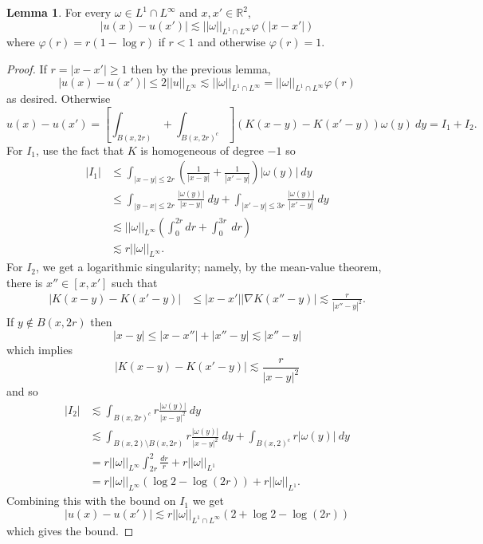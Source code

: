 \documentclass[12pt]{book}
\newcommand{\RR}{\mathbb{R}}
\theoremstyle{definition}
\newtheorem{lemma}[theorem]{Lemma}
\begin{document}
\begin{lemma}
For every $\omega \in L^1 \cap L^\infty$ and $x, x' \in \RR^2$,
$$|u(x) - u(x')| \lesssim ||\omega||_{L^1 \cap L^\infty} \varphi(|x - x'|)$$
where
$\varphi(r) = r(1 - \log r)$ if $r < 1$ and otherwise $\varphi(r) = 1$.
\end{lemma}
\begin{proof}
If $r = |x - x'| \geq 1$ then by the previous lemma,
$$|u(x) - u(x')| \leq 2||u||_{L^\infty} \lesssim ||\omega||_{L^1 \cap L^\infty} = ||\omega||_{L^1 \cap L^\infty} \varphi(r)$$
as desired. Otherwise
$$u(x) - u(x') = \left[\int_{B(x, 2r)} + \int_{B(x, 2r)^c}\right] (K(x - y) - K(x' - y)) \omega(y) ~dy = I_1 + I_2.$$
For $I_1$, use the fact that $K$ is homogeneous of degree $-1$ so
\begin{align*}
|I_1| &\leq \int_{|x - y| \leq 2r} \left(\frac{1}{|x - y|} + \frac{1}{|x' - y|}\right) |\omega(y)| ~dy\\
&\leq \int_{|y - x| \leq 2r} \frac{|\omega(y)|}{|x - y|} ~dy + \int_{|x' - y| \leq 3r} \frac{|\omega(y)|}{|x' - y|} ~dy\\
&\lesssim ||\omega||_{L^\infty} \left(\int_0^{2r} dr + \int_0^{3r} ~dr\right)\\
&\lesssim r||\omega||_{L^\infty}.
\end{align*}
For $I_2$, we get a logarithmic singularity; namely, by the mean-value theorem, there is $x'' \in [x, x']$ such that
\begin{align*}
|K(x - y) - K(x' - y)| &\leq |x - x'| |\nabla K(x'' - y)| \lesssim \frac{r}{|x'' - y|^2}.
\end{align*}
If $y \notin B(x, 2r)$ then
$$|x - y| \leq |x - x''| + |x'' - y| \lesssim |x'' - y|$$
which implies
$$|K(x - y) - K(x' - y)| \lesssim \frac{r}{|x - y|^2}$$
and so
\begin{align*}
|I_2| &\lesssim \int_{B(x, 2r)^c} r\frac{|\omega(y)|}{|x - y|^2} ~dy\\
&\lesssim \int_{B(x, 2) \setminus B(x, 2r)} r\frac{|\omega(y)|}{|x - y|^2} ~dy + \int_{B(x, 2)^c} r|\omega(y)| ~dy\\
&= r||\omega||_{L^\infty} \int_{2r}^2 \frac{dr}{r} + r||\omega||_{L^1}\\
&= r||\omega||_{L^\infty}(\log 2 - \log(2r)) + r||\omega||_{L^1}.
\end{align*}
Combining this with the bound on $I_1$ we get
$$|u(x) - u(x')| \lesssim r||\omega||_{L^1 \cap L^\infty}(2 + \log 2 - \log(2r))$$
which gives the bound.
\end{proof}
\end{document}
